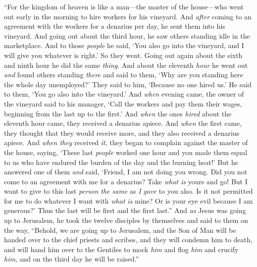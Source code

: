 \begin{biblechapter} %
 “For the kingdom of heaven is like a man—the master of the house—who went out early in the morning to hire workers for his vineyard.
\verse And \textit{after} coming to an agreement with the workers for a denarius per day, he sent them into his vineyard.
\verse And going out about the third hour, he saw others standing idle in the marketplace.
\verse And to those \textit{people} he said, ‘You also go into the vineyard, and I will give you whatever is right.’
\verse So they went. Going out again about the sixth and ninth hour he did the same \textit{thing}.
\verse And about the eleventh \textit{hour} he went out \textit{and} found others standing \textit{there} and said to them, ‘Why are you standing here the whole day unemployed?’
\verse They said to him, ‘Because no one hired us.’ He said to them, ‘You go also into the vineyard.’
\verse And \textit{when} evening came, the owner of the vineyard said to his manager, ‘Call the workers and pay them their wages, beginning from the last up to the first.’
\verse And \textit{when} the ones \textit{hired} about the eleventh hour came, they received a denarius apiece.
\verse And \textit{when} the first came, they thought that they would receive more, and they also received a denarius apiece.
\verse And \textit{when they} received \textit{it}, they began to complain against the master of the house,
\verse saying, ‘These last \textit{people} worked one hour and you made them equal to us who have endured the burden of the day and the burning heat!’
\verse But he answered one of them \textit{and} said, ‘Friend, I am not doing you wrong. Did you not come to an agreement with me for a denarius?
\verse Take \textit{what is} yours and go! But I want to give to this last \textit{person} \textit{the same} as \textit{I gave} to you also.
\verse Is it not permitted for me to do whatever I want with \textit{what is} mine? Or is your eye evil because I am generous?’
\verse Thus the last will be first and the first last.”
 And \textit{as} Jesus was going up to Jerusalem, he took the twelve disciples by themselves and said to them on the way,
\verse “Behold, we are going up to Jerusalem, and the Son of Man will be handed over to the chief priests and scribes, and they will condemn him to death,
\verse and will hand him over to the Gentiles to mock \textit{him} and flog \textit{him} and crucify \textit{him}, and on the third day he will be raised.”

\end{biblechapter}

